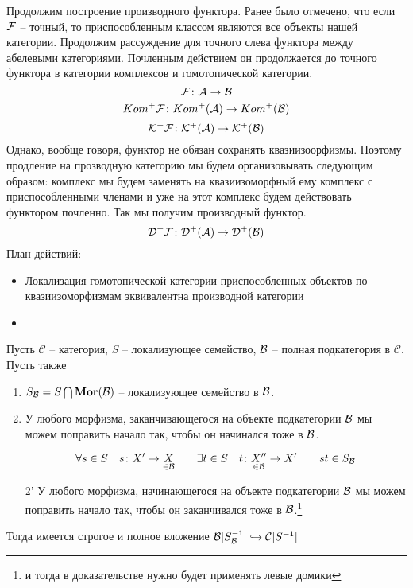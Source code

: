 \documentclass[../main.tex]{subfiles}
\begin{document}
Продолжим построение производного функтора. Ранее было отмечено, что если $\mathcal{F}$ -- точный, то приспособленным классом являются все объекты нашей категории. Продолжим рассуждение для точного слева функтора между абелевыми категориями. Почленным действием он продолжается до точного функтора в категории комплексов и гомотопической категории.
\[\mathcal{F}\colon \mathcal{A} \to \mathcal{B}\]
\[Kom^+\mathcal{F}\colon Kom^+(\mathcal{A}) \to Kom^+(\mathcal{B})\]
\[\mathcal{K^+ F}\colon \mathcal{K^+(\mathcal{A})} \to \mathcal{K^+(\mathcal{B})}\]
Однако, вообще говоря, функтор не обязан сохранять квазиизоорфизмы. Поэтому продление на прозводную категорию мы будем организовывать следующим образом: комплекс мы будем заменять на квазиизоморфный ему комплекс с приспособленными членами и уже на этот комплекс будем действовать функтором почленно. Так мы получим производный функтор.
\[\mathcal{D^+ F} \colon \mathcal{D^+(\mathcal{A})} \to \mathcal{D^+(\mathcal{B})}\]
План действий:\\
\begin{itemize}
    \item Локализация гомотопической категории приспособленных объектов по квазиизоморфизмам эквивалентна производной категории
    \item {}
\end{itemize}
\begin{to_lem}
\label{AB}
Пусть $\mathcal{C}$ -- категория, $S$ -- локализующее семейство, $\mathcal{B}$ -- полная подкатегория в $\mathcal{C}$.  Пусть также 
\begin{enumerate}
    \item $S_{\mathcal{B}} = S \bigcap \mathbf{Mor}(\mathcal{B})$ -- локализующее семейство в $\mathcal{B}$.
    \item У любого морфизма, заканчивающегося на объекте подкатегории $\mathcal{B}$ мы можем поправить начало так, чтобы он начинался тоже в $\mathcal{B}$.
    \bee
    \eee
    \[\forall s \in S \quad s \colon X' \to \underset{\in \mathcal{B}}{X} \qquad \exists t \in S \quad t \colon \underset{\in \mathcal{B}}{X''} \to X' \qquad st \in S_{\mathcal{B}}\]
    \item[2'] У любого морфизма, начинающегося на объекте подкатегории $\mathcal{B}$ мы можем поправить начало так, чтобы он заканчивался тоже в $\mathcal{B}$.\footnote{и тогда в доказательстве нужно будет применять левые домики}
    \bee
    \eee
\end{enumerate}
Тогда имеется строгое и полное вложение $\mathcal{B}[S_{\mathcal{B}}^{-1}] \hookrightarrow \mathcal{C}[S^{-1}]$
\end{to_lem}
\end{document}
